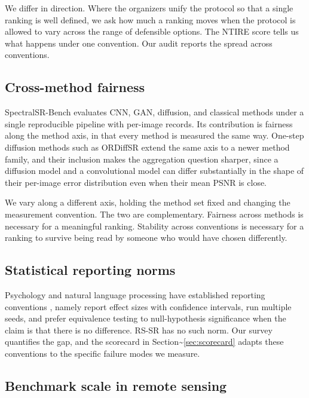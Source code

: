 \documentclass{interact}
\begin{document}
We differ in direction. Where the organizers unify the protocol so that a single ranking is well defined, we ask how much a ranking moves when the protocol is allowed to vary across the range of defensible options. The NTIRE score tells us what happens under one convention. Our audit reports the spread across conventions.

\subsection{Cross-method fairness}\label{sec:fairness}

SpectralSR-Bench \citep{shokoohi2026} evaluates CNN, GAN, diffusion, and classical methods under a single reproducible pipeline with per-image records. Its contribution is fairness along the method axis, in that every method is measured the same way. One-step diffusion methods such as ORDiffSR \citep{tang2026a} extend the same axis to a newer method family, and their inclusion makes the aggregation question sharper, since a diffusion model and a convolutional model can differ substantially in the shape of their per-image error distribution even when their mean PSNR is close.

We vary along a different axis, holding the method set fixed and changing the measurement convention. The two are complementary. Fairness across methods is necessary for a meaningful ranking. Stability across conventions is necessary for a ranking to survive being read by someone who would have chosen differently.

\subsection{Statistical reporting norms}\label{sec:reporting}

Psychology and natural language processing have established reporting conventions \citep{reimers2017,bouthillier2021}, namely report effect sizes with confidence intervals, run multiple seeds, and prefer equivalence testing to null-hypothesis significance when the claim is that there is no difference. RS-SR has no such norm. Our survey quantifies the gap, and the scorecard in Section\textasciitilde{}\ref{sec:scorecard} adapts these conventions to the specific failure modes we measure.

\subsection{Benchmark scale in remote sensing}\label{sec:scale}
\end{document}
